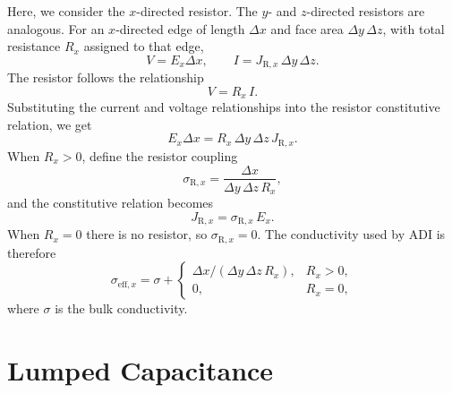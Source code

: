\documentclass{article}
\numberwithin{equation}{section}
\numberwithin{figure}{section}
\begin{document}
Here, we consider the $x$-directed resistor. The $y$- and $z$-directed resistors are analogous. For an $x$-directed edge of length $\Delta x$ and face area $\Delta y\,\Delta z$, with total resistance $R_x$ assigned to that edge,
\begin{equation}
    V = E_x\Delta x,
    \qquad
    I = J_{\mathrm{R},x}\,\Delta y\,\Delta z.
\end{equation}
The resistor follows the relationship
\begin{equation}
    V = R_x\,I.
\end{equation}
Substituting the current and voltage relationships into the resistor constitutive relation, we get
\begin{equation}\label{eq:resistor-constitutive}
    E_x\Delta x
    = R_x\,\Delta y\,\Delta z\,J_{\mathrm{R},x}.
\end{equation}
When $R_x>0$, define the resistor coupling
\begin{equation}\label{eq:resistor-coupling}
    \sigma_{\mathrm{R},x} = \frac{\Delta x}{\Delta y\,\Delta z\,R_x},
\end{equation}
and the constitutive relation becomes
\begin{equation}\label{eq:resistor-current}
    J_{\mathrm{R},x} = \sigma_{\mathrm{R},x}\,E_x.
\end{equation}
When $R_x=0$ there is no resistor, so $\sigma_{\mathrm{R},x}=0$. The conductivity used by ADI is therefore
\begin{equation}\label{eq:resistor-sigma-eff}
    \sigma_{\mathrm{eff},x}
    = \sigma
    + \begin{cases}
        \Delta x/(\Delta y\,\Delta z\,R_x), & R_x>0, \\
        0,                                  & R_x=0,
    \end{cases}
\end{equation}
where $\sigma$ is the bulk conductivity.

\section{Lumped Capacitance}
\end{document}

